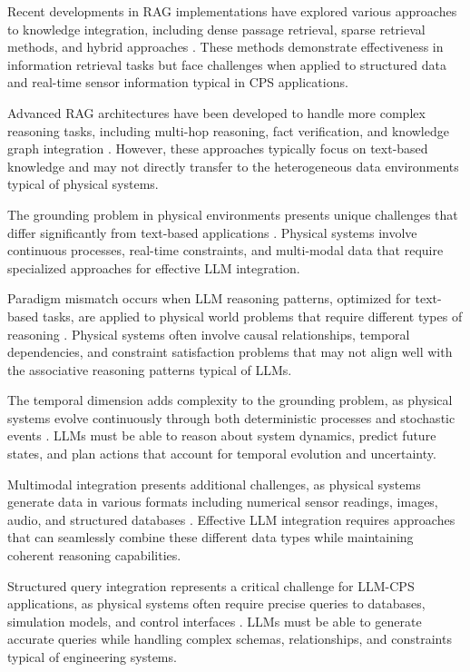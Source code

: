 Recent developments in RAG implementations have explored various approaches to knowledge integration, including dense passage retrieval, sparse retrieval methods, and hybrid approaches \cite{khattab2020colbert, karpukhin2020dense, xiong2020approximate}. These methods demonstrate effectiveness in information retrieval tasks but face challenges when applied to structured data and real-time sensor information typical in CPS applications.

Advanced RAG architectures have been developed to handle more complex reasoning tasks, including multi-hop reasoning, fact verification, and knowledge graph integration \cite{petroni2021kilt, yasunaga2021qa}. However, these approaches typically focus on text-based knowledge and may not directly transfer to the heterogeneous data environments typical of physical systems.

The grounding problem in physical environments presents unique challenges that differ significantly from text-based applications \cite{harnad1990symbol, barsalou2008grounded}. Physical systems involve continuous processes, real-time constraints, and multi-modal data that require specialized approaches for effective LLM integration.

Paradigm mismatch occurs when LLM reasoning patterns, optimized for text-based tasks, are applied to physical world problems that require different types of reasoning \cite{marcus2020next}. Physical systems often involve causal relationships, temporal dependencies, and constraint satisfaction problems that may not align well with the associative reasoning patterns typical of LLMs.

The temporal dimension adds complexity to the grounding problem, as physical systems evolve continuously through both deterministic processes and stochastic events \cite{pearl2000causality}. LLMs must be able to reason about system dynamics, predict future states, and plan actions that account for temporal evolution and uncertainty.

Multimodal integration presents additional challenges, as physical systems generate data in various formats including numerical sensor readings, images, audio, and structured databases \cite{baltrusaitis2018multimodal}. Effective LLM integration requires approaches that can seamlessly combine these different data types while maintaining coherent reasoning capabilities.

Structured query integration represents a critical challenge for LLM-CPS applications, as physical systems often require precise queries to databases, simulation models, and control interfaces \cite{scholak2021duorat, yu2018spider}. LLMs must be able to generate accurate queries while handling complex schemas, relationships, and constraints typical of engineering systems.

